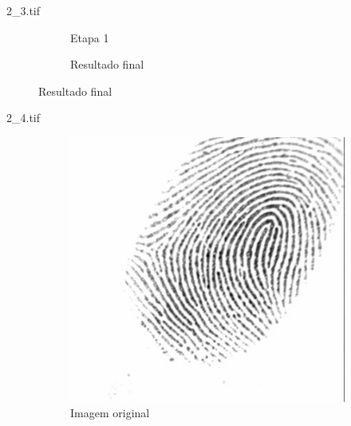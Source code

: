 \documentclass{beamer}
\begin{document}
\begin{frame}{2\_3.tif}
\begin{figure}
\begin{subfigure}[!ht]{0.32\textwidth}
                \caption{Etapa 1}
            \end{subfigure}
            \begin{subfigure}[!ht]{0.32\textwidth}
                \caption{Resultado final}
            \end{subfigure}
        \end{figure}
    \end{frame}

    \begin{frame}{2\_4.tif}
        \begin{figure}
            \centering
            \begin{subfigure}[!ht]{0.32\textwidth}
                \includegraphics[width=\columnwidth]{Fingerprints/2_4.jpg}
                \caption{Imagem original}
            \end{subfigure}
            \begin{subfigure}[!ht]{0.32\textwidth}

\end{subfigure}
\end{figure}
\end{frame}
\end{document}
